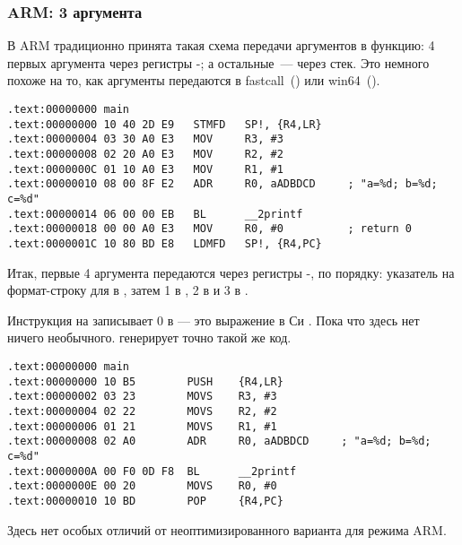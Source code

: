 \subsubsection{ARM: 3 аргумента}

В ARM традиционно принята такая схема передачи аргументов в функцию: 
4 первых аргумента через регистры -; а остальные~--- через стек.
Это немного похоже на то, как аргументы передаются в 
fastcall~() или win64~().


\mysubparagraph{\NonOptimizingKeilVI (\ARMMode)}

\begin{lstlisting}[caption=\NonOptimizingKeilVI (\ARMMode),style=customasm]
.text:00000000 main
.text:00000000 10 40 2D E9   STMFD   SP!, {R4,LR}
.text:00000004 03 30 A0 E3   MOV     R3, #3
.text:00000008 02 20 A0 E3   MOV     R2, #2
.text:0000000C 01 10 A0 E3   MOV     R1, #1
.text:00000010 08 00 8F E2   ADR     R0, aADBDCD     ; "a=%d; b=%d; c=%d"
.text:00000014 06 00 00 EB   BL      __2printf
.text:00000018 00 00 A0 E3   MOV     R0, #0          ; return 0
.text:0000001C 10 80 BD E8   LDMFD   SP!, {R4,PC}
\end{lstlisting}

Итак, первые 4 аргумента передаются через регистры -, по порядку: 
указатель на формат-строку для \printf
в , затем 1 в , 2 в  и 3 в .

Инструкция на  записывает 0 в  --- это выражение в Си .
Пока что здесь нет ничего необычного.
\OptimizingKeilVI генерирует точно такой же код.

\mysubparagraph{\OptimizingKeilVI (\ThumbMode)}

\begin{lstlisting}[caption=\OptimizingKeilVI (\ThumbMode),style=customasm]
.text:00000000 main
.text:00000000 10 B5        PUSH    {R4,LR}
.text:00000002 03 23        MOVS    R3, #3
.text:00000004 02 22        MOVS    R2, #2
.text:00000006 01 21        MOVS    R1, #1
.text:00000008 02 A0        ADR     R0, aADBDCD     ; "a=%d; b=%d; c=%d"
.text:0000000A 00 F0 0D F8  BL      __2printf
.text:0000000E 00 20        MOVS    R0, #0
.text:00000010 10 BD        POP     {R4,PC}
\end{lstlisting}

Здесь нет особых отличий от неоптимизированного варианта для режима ARM.
\label{ARM_B_to_printf}

